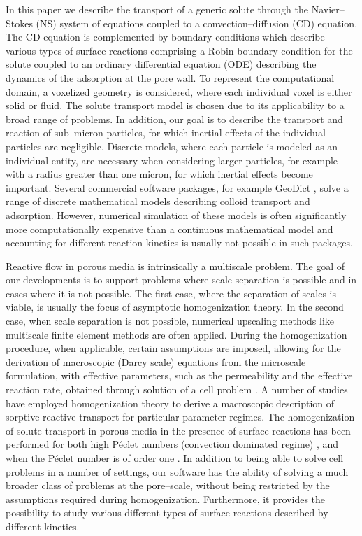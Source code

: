 \documentclass[preprint, 1p, authoryear]{elsarticle}
\begin{document}
In this paper we describe the transport of a generic solute through the  Navier--Stokes (NS) system of equations coupled to  a convection--diffusion  (CD) equation.  The CD equation is complemented by boundary conditions which describe various types of surface reactions comprising a  Robin  boundary condition for the solute coupled to an ordinary differential equation (ODE) describing the dynamics of the adsorption at the pore wall.  
To represent the computational domain,  a voxelized geometry is considered, where each individual voxel is either solid or fluid. 
 The solute transport model is chosen due to its applicability to a broad range of problems.
In addition, our  goal is to describe the transport and reaction of sub--micron particles, for which inertial effects of the individual particles are negligible. 
Discrete models, where  each  particle is modeled as an individual entity,  are necessary when  considering larger particles, for example with a radius greater  than one micron,  for which inertial effects become important.  Several commercial software packages, for example GeoDict \citep{Geodict}, solve a range of discrete mathematical models describing colloid transport and adsorption. However, numerical simulation of these models is  often significantly more computationally expensive  than a continuous mathematical model and accounting for different reaction kinetics is usually not possible in such packages.  


Reactive flow in porous media is intrinsically a multiscale problem. The goal of our developments is to support    problems where scale separation is   possible and in cases where it is not possible. The first case, where the  separation of scales is viable,  is usually the focus  of asymptotic homogenization theory. In the second case, when  scale separation is not possible,  numerical upscaling methods like  multiscale finite element methods are often applied.  During the homogenization procedure, when applicable, certain assumptions are imposed, allowing for the derivation of  macroscopic (Darcy scale) equations from the microscale formulation, with effective parameters, such as the permeability and the effective reaction rate, obtained through solution of a  cell problem \citep{hornung1997homogenization}.  
  A number of studies have employed homogenization theory to derive a macroscopic description of sorptive reactive transport for particular parameter regimes.   The homogenization of solute transport in porous media in the presence of surface reactions has been performed for both high P\'eclet numbers   (convection dominated regime) \citep{Allaire2010Homogenization,Allaire2010Twoscale,Allaire2012}, and when the P\'eclet number  is of order one \citep{HornungMikelic,KumarPop,Knabner}.   
In addition to being able to solve cell problems in a number of settings, our software has the ability of solving a much broader class of problems at the pore--scale, without being restricted by the assumptions required during  homogenization.  Furthermore, it provides the possibility to study various different types of surface reactions  described by different kinetics. 
 
\end{document}
